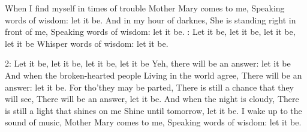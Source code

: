 \beginverse
When I find myself in times of trouble
Mother Mary comes to me,
Speaking words of wisdom: let it be. 
And in my hour of darknes,
She is standing right in front of me,
Speaking words of wisdom: let it be. 
\endverse
{}:
Let it be, let it be, let it be, let it be
Whisper words of wisdom: let it be.

2:
Let it be, let it be, let it be, let it be
Yeh, there will be an answer: let it be
\endchorus
\beginverse*
And when the broken-hearted people
Living in the world  agree,
There will be an answer: let it be.
For tho’they may be parted,
There is still a chance that they will see,
There will be an answer, let it be. 
\endverse
\beginverse*
And when the night is cloudy,
There is still a light that shines on me
Shine until tomorrow, let it be. 
I wake up to the sound of music, 
Mother Mary comes to me,
Speaking words of wisdom: let it be. 
\endverse
\endsong